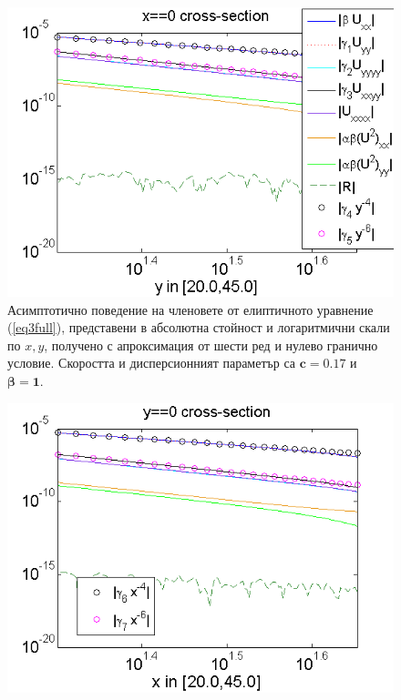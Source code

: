\documentclass[a4paper]{article}
\newcommand{\rf}[1]{(\ref{#1})}
\theoremstyle{remark}
\begin{document}
\begin{large}
\begin{figure}[ht]
\begin{minipage}[b]{0.95\linewidth}
		\includegraphics[width=\linewidth]{AssymptForEachTerm/c017_bt1_5/ChristovIC_AlongY_50_ZB2_bt1_c017_h020_O(h^6).png}
	\end{minipage}
	\caption{Асимптотично поведение на членовете от елиптичното уравнение \rf{eq3full}, представени в абсолютна стойност и логаритмични скали по $x,y$, получено с апроксимация от шести ред и нулево гранично условие. Скоростта и дисперсионният параметър са $\boldsymbol{c=0.17}$ и $\boldsymbol{\beta = 1}$. }
	\label{fig:assympt_c017bt1}
\end{figure}
\FloatBarrier
\begin{figure}[ht]
	\begin{minipage}[b]{0.95\linewidth}
		\raggedleft
		\includegraphics[width=\linewidth]{AssymptForEachTerm/c017_bt1_5/ChristovIC_AlongX_50_ZB2_bt3_c017_h020_O(h^6).png}

\end{minipage}
\end{figure}
\end{large}
\end{document}
